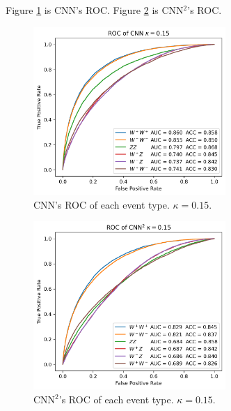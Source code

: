 \documentclass[12pt]{article}
\begin{document}
		Figure \ref{fig:CNN_event_roc_015} is CNN's ROC.  Figure \ref{fig:CNNsq_event_roc_015} is CNN${}^2$'s ROC.
		\begin{figure}[htpb]
			\centering
			\includegraphics[width=0.65\textwidth]{event_ROC_CNN_kappa0.15-1000k.png}
			\caption{CNN's ROC of each event type. $\kappa=0.15$.}
			\label{fig:CNN_event_roc_015}
		\end{figure}
		\begin{figure}[htpb]
			\centering
			\includegraphics[width=0.65\textwidth]{event_ROC_CNNsq_kappa0.15-1000k.png}
			\caption{CNN$^2$'s ROC of each event type. $\kappa=0.15$.}
			\label{fig:CNNsq_event_roc_015}
		\end{figure}
\end{document}
